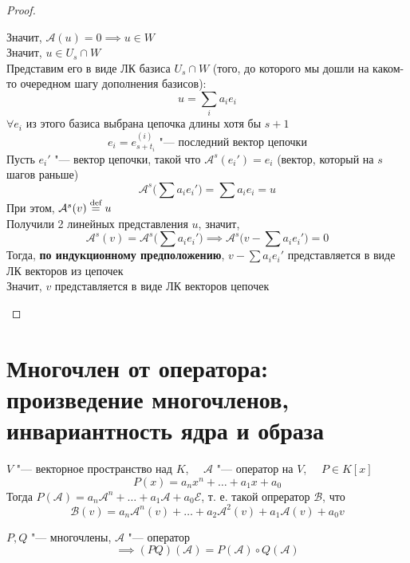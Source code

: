 \begin{proof}
\begin{itemize}
		Значит, $ \mathcal{A}(u) = 0 \implies u \in W $ \\
		Значит, $ u \in U_s \cap W $ \\
		Представим его в виде ЛК базиса $ U_s \cap W $ (того, до которого мы дошли на каком-то очередном шагу дополнения базисов):
		$$ u = \sum_i a_ie_i $$
		$ \forall e_i $ из этого базиса выбрана цепочка длины хотя бы $ s + 1 $
		$$ e_i = e_{s + t_i}^{(i)} \text{ "--- последний вектор цепочки} $$
		Пусть $ e_i' $ "--- вектор цепочки, такой что $ \mathcal{A}^s(e_i') = e_i $ (вектор, который на $ s $ шагов раньше)
		$$ \mathcal{A}^s \bigg( \sum a_ie_i' \bigg) = \sum a_ie_i = u $$
		При этом, $ \mathcal{A}^s(v) \stackrel{\text{def}}{=} u $ \\
		Получили 2 линейных представления $ u $, значит,
		$$ \mathcal{A}^s(v) = \mathcal{A}^s \bigg( \sum a_ie_i' \bigg) \implies \mathcal{A}^s \bigg( v - \sum a_ie_i' \bigg) = 0 $$
		Тогда, \textbf{по индукционному предположению}, $ v - \sum a_ie_i' $ представляется в виде ЛК векторов из цепочек \\
		Значит, $ v $ представляется в виде ЛК векторов цепочек
	\end{itemize}
\end{proof}

\section{Многочлен от оператора: произведение многочленов, инвариантность ядра и образа}

\begin{notation}
	$ V $ "--- векторное пространство над $ K $, $ \quad \mathcal{A} $ "--- оператор на $ V $, $ \quad P \in K[x] $
	$$ P(x) = a_nx^n + \dots + a_1x + a_0 $$
	Тогда $ P(\mathcal{A}) = a_n\mathcal{A}^n + \dots + a_1\mathcal{A} + a_0\mathcal{E} $, т. е. такой опрератор $ \mathcal{B} $, что
	$$ \mathcal{B}(v) = a_n \mathcal{A}^n(v) + \dots + a_2\mathcal{A}^2(v) + a_1\mathcal{A}(v) + a_0v $$
\end{notation}

\begin{lemma}
	$ P, Q $ "--- многочлены, $ \mathcal{A} $ "--- оператор
	$$ \implies (PQ)(\mathcal{A}) = P(\mathcal{A}) \circ Q(\mathcal{A}) $$
\end{lemma}

